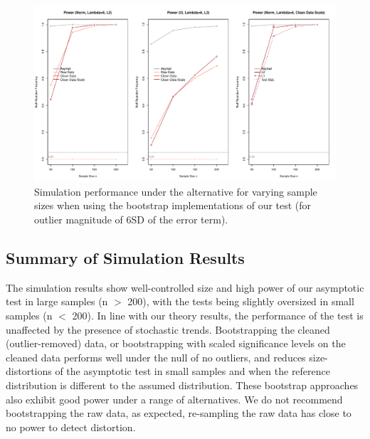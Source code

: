 \documentclass[11pt, letterpaper]{article}
\numberwithin{algorithm}{section}
\numberwithin{assumption}{section}
\numberwithin{lemma}{section}
\numberwithin{theorem}{section}
\numberwithin{corollary}{section}
\numberwithin{remark}{section}
\numberwithin{equation}{section}
\numberwithin{figure}{section}
\numberwithin{table}{section}
\begin{document}
\begin{figure}[!htbp]  %
\centering
\includegraphics[width = \textwidth]{boot_alt_lambda6.pdf}
\caption{Simulation performance under the alternative for varying sample sizes when using the bootstrap implementations of our test (for outlier magnitude of 6SD of the error term).}
\label{fig_out_sim_alt_boot6}
\end{figure}

\subsection{Summary of Simulation Results}
The simulation results show well-controlled size and high power of our asymptotic test in large samples (n $>$ 200), with the tests being slightly oversized in small samples (n $<$ 200). In line with our theory results, the performance of the test is unaffected by the presence of stochastic trends. Bootstrapping the cleaned (outlier-removed) data, or bootstrapping with scaled significance levels on the cleaned data performs well under the null of no outliers, and reduces size-distortions of the asymptotic test in small samples and when the reference distribution is different to the assumed distribution. These bootstrap approaches also exhibit good power under a range of alternatives. We do not recommend bootstrapping the raw data, as expected, re-sampling the raw data has close to no power to detect distortion.


\end{document}
